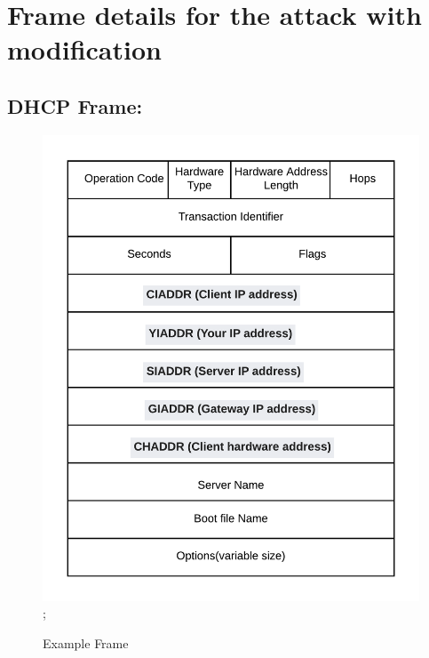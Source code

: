 \documentclass[12pt]{article}
\begin{document}
\begin{sloppypar}
\section{Frame details for the attack with modification}

\subsection{DHCP Frame:}
\begin{figure}[h]
	\centering
	\includegraphics[width=13 cm,height=15 cm]{images/packet_header.png};
	\caption{Example Frame}
\end{figure}

\newpage


\end{sloppypar}
\end{document}
